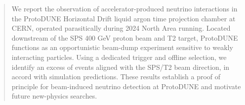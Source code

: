 \begin{abstract}
We report the observation of accelerator-produced neutrino interactions in the ProtoDUNE Horizontal Drift liquid argon time projection chamber at CERN, operated parasitically during 2024 North Area running. Located downstream of the SPS 400 GeV proton beam and T2 target, ProtoDUNE functions as an opportunistic beam-dump experiment sensitive to weakly interacting particles. Using a dedicated trigger and offline selection, we identify an excess of events aligned with the SPS/T2 beam direction, in accord with simulation predictions.
These results establish a proof of principle for beam-induced neutrino detection at ProtoDUNE and motivate future new-physics searches.
\end{abstract}